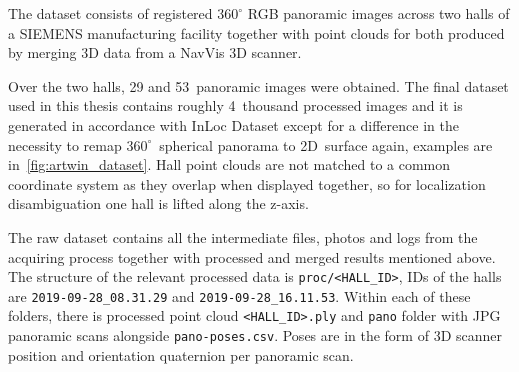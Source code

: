 The dataset consists of registered $360^{\circ}$ RGB panoramic images across two halls of
a SIEMENS manufacturing facility together with point clouds for both produced by merging
3D data from a NavVis 3D scanner.

Over the two halls, 29 and 53~panoramic images were obtained. The final dataset used in
this thesis contains roughly 4~thousand processed images and it is generated in accordance
with InLoc Dataset except for a difference in the necessity to remap
$360^{\circ}$~spherical panorama to 2D~surface again, examples are
in~\cref{fig:artwin_dataset}. Hall point clouds are not matched to a common coordinate
system as they overlap when displayed together, so for localization disambiguation one
hall is lifted along the z-axis.

The raw dataset contains all the intermediate files, photos and logs from the acquiring
process together with processed and merged results mentioned above. The structure of the
relevant processed data is \verb|proc/<HALL_ID>|, IDs of the halls are
\verb|2019-09-28_08.31.29| and \verb|2019-09-28_16.11.53|. Within each of these folders,
there is processed point cloud \verb|<HALL_ID>.ply| and \verb|pano| folder with JPG
panoramic scans alongside \verb|pano-poses.csv|. Poses are in the form of 3D scanner
position and orientation quaternion per panoramic scan.

